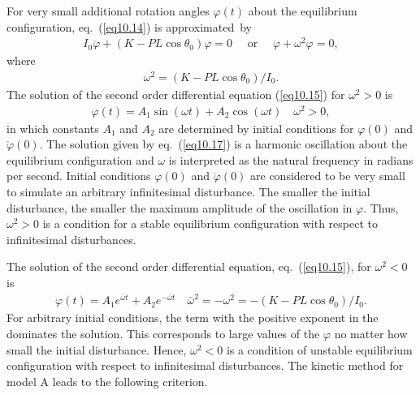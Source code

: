 \documentclass{AeroStructure-ERJohnson}
\begin{document}
For very small additional rotation angles $\varphi(t)$ about the equilibrium configuration, eq.~(\ref{eq10.14}) is approximated~by\vspace*{-6pt}
\begin{align}\label{eq10.15}
I_{0} \ddot{\varphi}+\left(K-P L \cos \theta_{0}\right) \varphi=0 \quad \text { or } \quad \ddot{\varphi}+\omega^{2} \varphi=0,
\end{align}
where
\begin{align}\label{eq10.16}
\omega^{2}=\left(K-P L \cos \theta_{0}\right) / I_{0}.
\end{align}
The solution of the second order differential equation (\ref{eq10.15}) for $\omega^{2}>0$ is
\begin{align}\label{eq10.17}
\varphi(t)=A_{1} \sin (\omega t)+A_{2} \cos (\omega t) \quad \omega^{2}>0,
\end{align}
in which constants $A_{1}$ and $A_{2}$ are determined by initial conditions for $\varphi(0)$ and $\dot{\varphi}(0)$. The solution given by eq.~(\ref{eq10.17}) is a harmonic oscillation about the equilibrium configuration and $\omega$ is interpreted as the natural frequency in radians per second. Initial conditions $\varphi(0)$ and $\dot{\varphi}(0)$ are considered to be very small to simulate an arbitrary infinitesimal disturbance. The smaller the initial disturbance, the smaller the maximum amplitude of the oscillation in $\varphi$. Thus, $\omega^{2}>0$ is a condition for a stable equilibrium configuration with respect to infinitesimal disturbances.

The solution of the second order differential equation, eq.~(\ref{eq10.15}), for $\omega^{2}<0$ is
\begin{align}\label{eq10.18}
\varphi(t)=A_{1} e^{\bar{\omega} t}+A_{2} e^{-\bar{\omega} t} \quad \bar{\omega}^{2}=-\omega^{2}=-\left(K-P L \cos \theta_{0}\right) / I_{0}.
\end{align}
For arbitrary initial conditions, the term with the positive exponent in the dominates the solution. This corresponds to large values of the $\varphi$ no matter how small the initial disturbance. Hence, $\omega^{2}<0$ is a condition of unstable equilibrium configuration with respect to infinitesimal disturbances. The kinetic method for model A leads to the following criterion.\enlargethispage{0.6\baselineskip}
\end{document}
